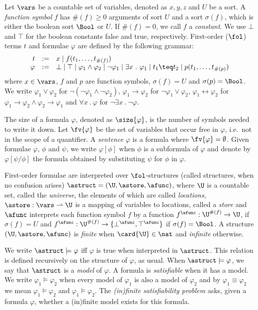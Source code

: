 Let $\vars$ be a countable set of variables, denoted as $x,y,z$ and
$U$ be a sort. A \emph{function symbol} $f$ has $\#(f) \geq 0$
arguments of sort $U$ and a sort $\sigma(f)$, which is either the
boolean sort $\Bool$ or $U$. If $\#(f)=0$, we call $f$ a
\emph{constant}. We use $\bot$ and $\top$ for the boolean constants
false and true, respectively. First-order ($\fol$) terms $t$ and
formulae $\varphi$ are defined by the following grammar:
\[\begin{array}{rcl}
t & := & x \mid f(t_1,\ldots,t_{\#(f)}) \\ \varphi & := & \bot \mid
\top \mid \varphi_1 \wedge \varphi_2 \mid \neg \varphi_1 \mid \exists
x ~.~ \varphi_1 \mid t_1 \teq t_2 \mid p(t_1,\ldots,t_{\#(p)})
\end{array}\]
where $x\in \vars$, $f$ and $p$ are function symbols, $\sigma(f)=U$
and $\sigma(p)=\Bool$. We write $\varphi_1 \vee \varphi_2$ for
$\neg(\neg\varphi_1 \wedge \neg\varphi_2)$, $\varphi_1 \rightarrow
\varphi_2$ for $\neg\varphi_1 \vee \varphi_2$, $\varphi_1
\leftrightarrow \varphi_2$ for $\varphi_1 \rightarrow \varphi_2 \wedge
\varphi_2 \rightarrow \varphi_1$ and $\forall x ~.~ \varphi$ for
$\neg\exists x ~.~ \neg\varphi$.

The size of a formula $\varphi$, denoted as $\size{\varphi}$, is the
number of symbols needed to write it down. Let $\fv{\varphi}$ be the
set of variables that occur free in $\varphi$, i.e.\ not in the scope
of a quantifier. A \emph{sentence} $\varphi$ is a formula where
$\fv{\varphi} = \emptyset$. Given formulae $\varphi$, $\phi$ and
$\psi$, we write $\varphi[\phi]$ when $\phi$ is a subformula of
$\varphi$ and denote by $\varphi[\psi/\phi]$ the formula obtained by
substituting $\psi$ for $\phi$ in $\varphi$.

First-order formulae are interpreted over $\fol$-structures (called
structures, when no confusion arises) $\astruct =
(\U,\astore,\afunc)$, where $\U$ is a countable set, called the
\emph{universe}, the elements of which are called \emph{locations},
$\astore : \vars \rightharpoonup \U$ is a mapping of variables to
locations, called a \emph{store} and $\afunc$ interprets each function
symbol $f$ by a function $f^\afunc : \U^{\#(f)} \rightarrow \U$, if
$\sigma(f) = U$ and $f^\afunc : \U^{\#(f)} \rightarrow
\{\bot^\afunc,\top^\afunc\}$ if $\sigma(f)= \Bool$. A structure
$(\U,\astore,\afunc)$ is \emph{finite} when $\card{\U} \in \nat$ and
\emph{infinite} otherwise.

We write $\astruct \models \varphi$ iff $\varphi$ is true when
interpreted in $\astruct$. This relation is defined recursively on the
structure of $\varphi$, as usual. When $\astruct \models \varphi$, we
say that $\astruct$ is a \emph{model} of $\varphi$.  A formula is
\emph{satisfiable} when it has a model. We write $\varphi_1 \models
\varphi_2$ when every model of $\varphi_1$ is also a model of
$\varphi_2$ and by $\varphi_1 \equiv \varphi_2$ we mean $\varphi_1
\models \varphi_2$ and $\varphi_1 \models \varphi_2$.  The
\emph{(in)finite satisfiability problem} asks, given a formula
$\varphi$, whether a (in)finite model exists for this formula.

